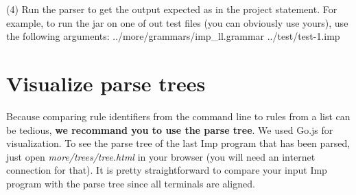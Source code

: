 (4) Run the parser to get the output expected as in the project statement.
For example, to run the jar on one of out test files (you can obviously use yours), use the following arguments:
../more/grammars/imp_ll.grammar ../test/test-1.imp

\section{Visualize parse trees}

Because comparing rule identifiers from the command line to rules from a list can be tedious,
\textbf{we recommand you to use the parse tree}. We used Go.js for visualization.
To see the parse tree of the last Imp program that has been parsed, just open \textit{more/trees/tree.html}
in your browser (you will need an internet connection for that).
It is pretty straightforward to compare your input Imp program with the parse tree since all terminals
are aligned.
